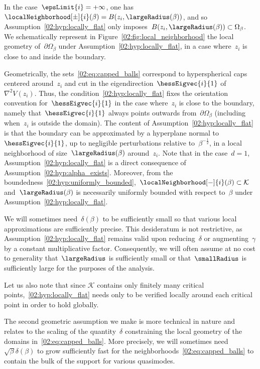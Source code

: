     In the case~$\epsLimit{i} = +\infty$, one has~$\localNeighborhood[\pm]{i}(\beta)=B(z_i,\largeRadius(\beta))$, and so Assumption~\eqref{02:hyp:locally_flat} only imposes~$B(z_i,\largeRadius(\beta))\subset \Omega_\beta$.
    We schematically represent in Figure~\ref{02:fig:local_neighborhood} the local geometry of~$\partial\Omega_\beta$ under Assumption~\eqref{02:hyp:locally_flat}, in a case where~$z_i$ is close to and inside the boundary.
    
    Geometrically, the sets~\eqref{02:eq:capped_balls} correspond to hyperspherical caps centered around~$z_i$ and cut in the eigendirection~$\hessEigvec{i}{1}$ of~$\nabla^2 V(z_i)$. Thus, the condition~\eqref{02:hyp:locally_flat} fixes the orientation convention for~$\hessEigvec{i}{1}$ in the case where~$z_i$ is close to the boundary, namely that~$\hessEigvec{i}{1}$ always points outwards from~$\partial\Omega_\beta$ (including when~$z_i$ is outside the domain).
    The content of Assumption~\eqref{02:hyp:locally_flat} is that the boundary can be approximated by a hyperplane normal to~$\hessEigvec{i}{1}$, up to negligible perturbations relative to~$\beta^{-\frac12}$, in a local neighborhood of size~$\largeRadius(\beta)$ around~$z_i$.
    Note that in the case~$d=1$, Assumption~\eqref{02:hyp:locally_flat} is a direct consequence of Assumption~\eqref{02:hyp:alpha_exists}. Moreover, from the boundedness~\eqref{02:hyp:uniformly_bounded},~$\localNeighborhood[-]{i}(\beta)\subset\mathcal K$ and~$\largeRadius(\beta)$ is necessarily uniformly bounded with respect to~$\beta$ under Assumption~\eqref{02:hyp:locally_flat}.
    
    \begin{remark}
        We will sometimes need~$\delta(\beta)$ to be sufficiently small so that various local approximations are sufficiently precise.
    This desideratum is not restrictive, as Assumption~\eqref{02:hyp:locally_flat} remains valid upon reducing~$\delta$ or augmenting~$\gamma$ by a constant multiplicative factor.
    Consequently, we will often assume at no cost to generality that~$\largeRadius$ is sufficiently small or that~$\smallRadius$ is sufficiently large for the purposes of the analysis.

    Let us also note that since $\mathcal K$ contains only finitely many critical points,~\eqref{02:hyp:locally_flat} needs only to be verified locally around each critical point in order to hold globally.
    \end{remark}
    
    The second geometric assumption we make is more technical in nature and relates to the scaling of the quantity~$\delta$ constraining the local geometry of the domains in~\eqref{02:eq:capped_balls}.
    More precisely, we will sometimes need~$\sqrt\beta\delta(\beta)$ to grow sufficiently fast for the neighborhoods~\eqref{02:eq:capped_balls} to contain the bulk of the support for various quasimodes.

